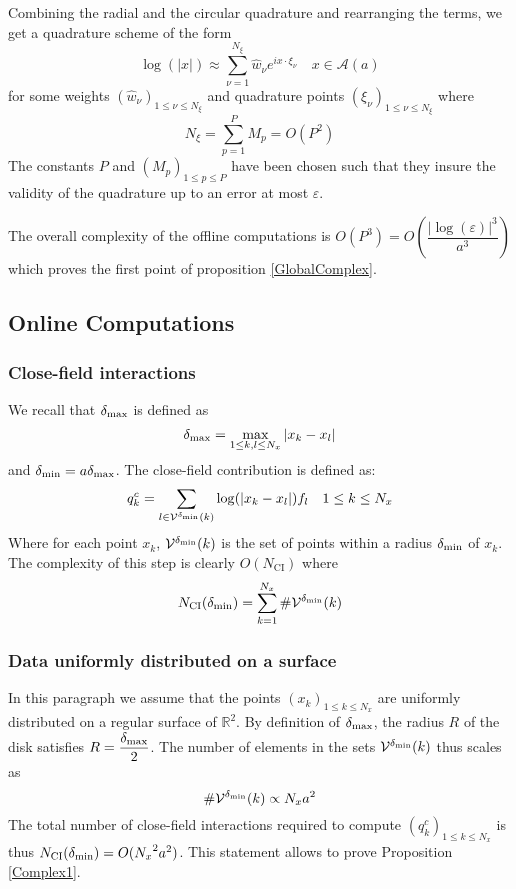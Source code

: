\documentclass[11pt,a4paper]{article}
\begin{document}
Combining the radial and the circular quadrature and rearranging the terms, we get a quadrature scheme of the form
\[ \log(|x|) \approx \sum_{\nu = 1}^{N_{\xi}} \hat{w}_{\nu}e^{i x \cdot \xi_\nu} \quad x \in \mathcal{A}(a)\] 
for some weights $(\hat{w}_{\nu})_{1 \leq \nu \leq N_{\xi}}$ and quadrature points $(\xi_{\nu})_{1 \leq \nu \leq N_{\xi}}$ where 
\[N_\xi = \sum_{p=1}^P M_p = O(P^2)\]
The constants $P$ and $(M_p)_{1 \leq p \leq P}$ have been chosen such that they insure the validity of the quadrature up to an error at most $\varepsilon$. 

The overall complexity of the offline computations is $O(P^3) = O\left(\dfrac{|\log(\varepsilon)|^3}{a^3}\right)$ which proves the first point of proposition \ref{GlobalComplex}. 

\subsection{Online Computations}


\subsubsection{Close-field interactions}
We recall that $\delta_{\max}$ is defined as 
\[\delta_{\max} = \max_{1\leq k,l\leq N_x} |x_k - x_l|\]
and $\delta_{\min} = a \delta_{\max}$. The close-field contribution is defined as:  
\[q_k^{c} = \sum_{l \in \mathcal{V}^{\delta_{\min}}(k)} \log(|x_k - x_l|)f_l \quad 1\leq k \leq N_x\]
Where for each point $x_k$, $\mathcal{V}^{\delta_{\min}}(k)$ is the set of points within a radius $\delta_{\min}$ of $x_k$. The complexity of this step is clearly $O(N_{\text{CI}})$ where
\[ N_{\textup{CI}}(\delta_{\min}) = \sum_{k=1}^{N_x} \# \mathcal{V}^{\delta_{\min}}(k)\]

\subsubsection*{Data uniformly distributed on a surface}

In this paragraph we assume that the points $(x_k)_{1\leq k \leq {N_x}}$ are uniformly distributed on a regular surface of $\mathbb{R}^2$. By definition of $\delta_{\max}$, the radius $R$ of the disk satisfies $R = \dfrac{\delta_{\max}}{2}$. The number of elements in the sets $\mathcal{V}^{\delta_{\min}}(k)$ thus scales as  
\[\#\mathcal{V}^{\delta_{\min}}(k) \propto {N_x} a^2\]
The total number of close-field interactions required to compute $(q_k^c)_{1 \leq k \leq {N_x}}$ is thus $N_{\text{CI}}(\delta_{\min}) = O({N_x}^2 a^2)$.  This statement allows to prove Proposition \ref{Complex1}.
\end{document}
